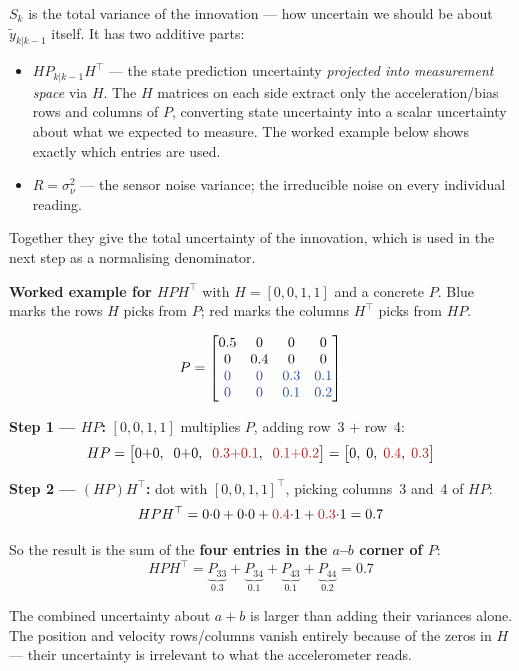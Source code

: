 \documentclass[12pt, a4paper]{article}
\begin{document}
$S_k$ is the total variance of the innovation --- how uncertain we
should be about $\tilde{y}_{k|k-1}$ itself.
It has two additive parts:
\begin{itemize}[leftmargin=1.4em, topsep=2pt]
  \item $H P_{k|k-1} H^\top$ --- the state prediction uncertainty
        \emph{projected into measurement space} via $H$.
        The $H$ matrices on each side extract only the
        acceleration/bias rows and columns of $P$, converting state
        uncertainty into a scalar uncertainty about what we expected
        to measure.
        The worked example below shows exactly which entries are used.
  \item $R = \sigma_\nu^2$ --- the sensor noise variance; the
        irreducible noise on every individual reading.
\end{itemize}
Together they give the total uncertainty of the innovation, which
is used in the next step as a normalising denominator.

\medskip
\begin{notebox}
\textbf{Worked example for $HPH^\top$} with $H=[0,0,1,1]$ and a
concrete $P$. {\color{keyblue}Blue} marks the rows $H$ picks from $P$;
{\color{warnred}red} marks the columns $H^\top$ picks from $HP$.

\[
P =
\begin{bmatrix}
  0.5 & 0   & 0   & 0   \\
  0   & 0.4 & 0   & 0   \\
  {\color{keyblue}0} & {\color{keyblue}0} & {\color{keyblue}0.3} & {\color{keyblue}0.1} \\
  {\color{keyblue}0} & {\color{keyblue}0} & {\color{keyblue}0.1} & {\color{keyblue}0.2}
\end{bmatrix}
\]

\textbf{Step 1 --- $HP$:} $[0,0,1,1]$ multiplies $P$, adding
{\color{keyblue}row~3} $+$ {\color{keyblue}row~4}:
\[
  HP = \bigl[0{+}0,\;\; 0{+}0,\;\;
       {\color{warnred}0.3{+}0.1},\;\;
       {\color{warnred}0.1{+}0.2}\bigr]
     = \bigl[0,\;0,\;{\color{warnred}0.4},\;{\color{warnred}0.3}\bigr]
\]

\textbf{Step 2 --- $(HP)H^\top$:} dot with $[0,0,1,1]^\top$, picking
{\color{warnred}columns~3 and~4} of $HP$:
\[
  HPH^\top
  = 0{\cdot}0 + 0{\cdot}0
    + {\color{warnred}0.4}{\cdot}1
    + {\color{warnred}0.3}{\cdot}1
  = 0.7
\]

So the result is the sum of the \textbf{four entries in the
$a$--$b$ corner of $P$}:
\[
  HPH^\top
  = \underbrace{P_{33}}_{0.3}
  + \underbrace{P_{34}}_{0.1}
  + \underbrace{P_{43}}_{0.1}
  + \underbrace{P_{44}}_{0.2}
  = 0.7
\]

The combined uncertainty about $a+b$ is larger than adding their variances alone.
The position and velocity rows/columns vanish entirely because of
the zeros in $H$ --- their uncertainty is irrelevant to what the
accelerometer reads.
\end{notebox}
\end{document}
